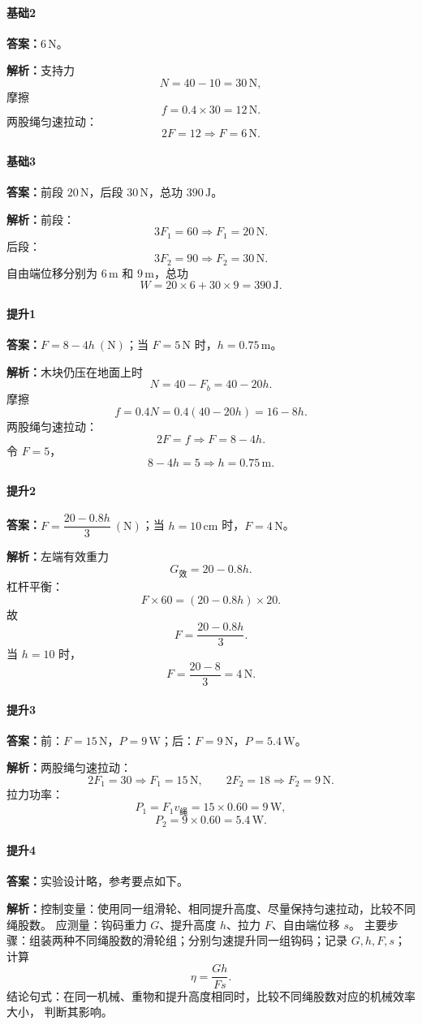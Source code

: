 \documentclass[12pt,a4paper]{ctexart}
\newcommand{\Ans}[1]{\par\noindent\textbf{答案：}#1\par}
\newcommand{\Sol}[1]{\par\noindent\textbf{解析：}#1\par}
\begin{document}
\paragraph{基础2}
\Ans{$6\,\mathrm{N}$。}
\Sol{支持力
\[
N=40-10=30\,\mathrm{N},
\]
摩擦
\[
f=0.4\times 30=12\,\mathrm{N}.
\]
两股绳匀速拉动：
\[
2F=12 \Rightarrow F=6\,\mathrm{N}.
\]}

\paragraph{基础3}
\Ans{前段 $20\,\mathrm{N}$，后段 $30\,\mathrm{N}$，总功 $390\,\mathrm{J}$。}
\Sol{前段：
\[
3F_1=60 \Rightarrow F_1=20\,\mathrm{N}.
\]
后段：
\[
3F_2=90 \Rightarrow F_2=30\,\mathrm{N}.
\]
自由端位移分别为 $6\,\mathrm{m}$ 和 $9\,\mathrm{m}$，总功
\[
W=20\times 6 + 30\times 9=390\,\mathrm{J}.
\]}

\paragraph{提升1}
\Ans{$F=8-4h\ (\mathrm{N})$；当 $F=5\,\mathrm{N}$ 时，$h=0.75\,\mathrm{m}$。}
\Sol{木块仍压在地面上时
\[
N=40-F_b=40-20h.
\]
摩擦
\[
f=0.4N=0.4(40-20h)=16-8h.
\]
两股绳匀速拉动：
\[
2F=f \Rightarrow F=8-4h.
\]
令 $F=5$，
\[
8-4h=5 \Rightarrow h=0.75\,\mathrm{m}.
\]}

\paragraph{提升2}
\Ans{$F=\dfrac{20-0.8h}{3}\ (\mathrm{N})$；当 $h=10\,\mathrm{cm}$ 时，$F=4\,\mathrm{N}$。}
\Sol{左端有效重力
\[
G_{\text{效}}=20-0.8h.
\]
杠杆平衡：
\[
F\times 60 = (20-0.8h)\times 20.
\]
故
\[
F=\frac{20-0.8h}{3}.
\]
当 $h=10$ 时，
\[
F=\frac{20-8}{3}=4\,\mathrm{N}.
\]}

\paragraph{提升3}
\Ans{前：$F=15\,\mathrm{N}$，$P=9\,\mathrm{W}$；后：$F=9\,\mathrm{N}$，$P=5.4\,\mathrm{W}$。}
\Sol{两股绳匀速拉动：
\[
2F_1=30 \Rightarrow F_1=15\,\mathrm{N},
\qquad
2F_2=18 \Rightarrow F_2=9\,\mathrm{N}.
\]
拉力功率：
\[
P_1=F_1v_{\text{绳}}=15\times 0.60=9\,\mathrm{W},
\]
\[
P_2=9\times 0.60=5.4\,\mathrm{W}.
\]}

\paragraph{提升4}
\Ans{实验设计略，参考要点如下。}
\Sol{控制变量：使用同一组滑轮、相同提升高度、尽量保持匀速拉动，比较不同绳股数。
应测量：钩码重力 $G$、提升高度 $h$、拉力 $F$、自由端位移 $s$。
主要步骤：组装两种不同绳股数的滑轮组；分别匀速提升同一组钩码；记录 $G,h,F,s$；
计算
\[
\eta=\frac{Gh}{Fs}.
\]
结论句式：在同一机械、重物和提升高度相同时，比较不同绳股数对应的机械效率大小，
判断其影响。}
\end{document}
